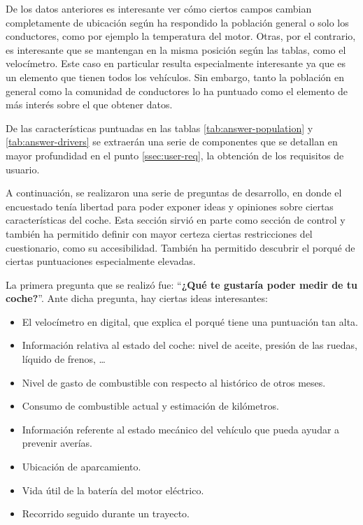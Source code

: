 De los datos anteriores es interesante ver cómo ciertos campos cambian completamente
de ubicación según ha respondido la población general o solo los conductores, como por
ejemplo la temperatura del motor. Otras, por el contrario, es interesante que se mantengan
en la misma posición según las tablas, como el velocímetro. Este caso en particular
resulta especialmente interesante ya que es un elemento que tienen todos los vehículos.
Sin embargo, tanto la población en general como la comunidad de conductores lo ha
puntuado como el elemento de más interés sobre el que obtener datos.

De las características puntuadas en las tablas \ref{tab:answer-population} y \ref{tab:answer-drivers}
se extraerán una serie de componentes que se detallan en mayor profundidad en el
punto \ref{ssec:user-req}, la obtención de los requisitos de usuario.

A continuación, se realizaron una serie de preguntas de desarrollo, en donde el
encuestado tenía libertad para poder exponer ideas y opiniones sobre ciertas
características del coche. Esta sección sirvió en parte como sección de control
y también ha permitido definir con mayor certeza ciertas restricciones del cuestionario,
como su accesibilidad. También ha permitido descubrir el porqué de ciertas puntuaciones
especialmente elevadas.

La primera pregunta que se realizó fue: ``\textbf{¿Qué te gustaría poder medir de tu coche?}''.
Ante dicha pregunta, hay ciertas ideas interesantes:

\begin{itemize}
  \item El velocímetro en digital, que explica el porqué tiene una puntuación tan alta.
  \item Información relativa al estado del coche: nivel de aceite, presión de las ruedas, líquido de frenos, \dots
  \item Nivel de gasto de combustible con respecto al histórico de otros meses.
  \item Consumo de combustible actual y estimación de kilómetros.
  \item Información referente al estado mecánico del vehículo que pueda ayudar a prevenir averías.
  \item Ubicación de aparcamiento.
  \item Vida útil de la batería del motor eléctrico.
  \item Recorrido seguido durante un trayecto.
\end{itemize}

